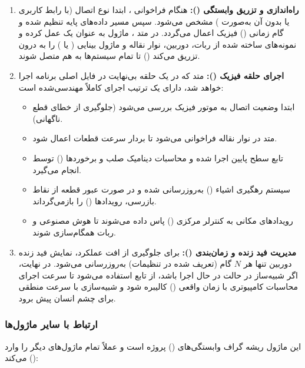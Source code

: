 \documentclass{article}
\begin{document}
\begin{enumerate}
	\item \textbf{راه‌اندازی و تزریق وابستگی ():}
	هنگام فراخوانی ، ابتدا نوع اتصال (با رابط کاربری  یا بدون آن به‌صورت ) مشخص می‌شود. سپس مسیر داده‌های پایه  تنظیم شده و گام زمانی () فیزیک اعمال می‌گردد. در متد ، ماژول به عنوان یک  عمل کرده و نمونه‌های ساخته شده از ربات، دوربین، نوار نقاله و ماژول بینایی ( یا ) را به درون  تزریق می‌کند () تا تمام سیستم‌ها به هم متصل شوند.
	
	\item \textbf{اجرای حلقه فیزیک ():}
	متد  که در یک حلقه بی‌نهایت در فایل اصلی برنامه اجرا خواهد شد، دارای یک ترتیب اجرای کاملاً مهندسی‌شده است:
	\begin{itemize}
		\item ابتدا وضعیت اتصال به موتور فیزیک بررسی می‌شود (جلوگیری از خطای قطع ناگهانی).
		\item متد  در نوار نقاله فراخوانی می‌شود تا بردار سرعت قطعات اعمال شود.
		\item تابع سطح پایین  اجرا شده و محاسبات دینامیک صلب و برخوردها () توسط  انجام می‌گیرد.
		\item سیستم رهگیری اشیاء () به‌روزرسانی شده و در صورت عبور قطعه از نقاط بازرسی، رویدادها () را بازمی‌گرداند.
		\item رویدادهای مکانی به کنترلر مرکزی () پاس داده می‌شوند تا هوش مصنوعی و ربات همگام‌سازی شوند.
	\end{itemize}
	
	\item \textbf{مدیریت فید زنده و زمان‌بندی ():}
	برای جلوگیری از افت عملکرد، نمایش فید زنده دوربین تنها هر $N$ گام (تعریف شده در تنظیمات) به‌روزرسانی می‌شود. در نهایت، اگر شبیه‌ساز در حالت  در حال اجرا باشد، از تابع  استفاده می‌شود تا سرعت اجرای محاسبات کامپیوتری با زمان واقعی () کالیبره شود و شبیه‌سازی با سرعت منطقی برای چشم انسان پیش برود.
\end{enumerate}

\subsubsection{ارتباط با سایر ماژول‌ها}
این ماژول ریشه گراف وابستگی‌های () پروژه است و عملاً تمام ماژول‌های دیگر را وارد () می‌کند:
\end{document}
